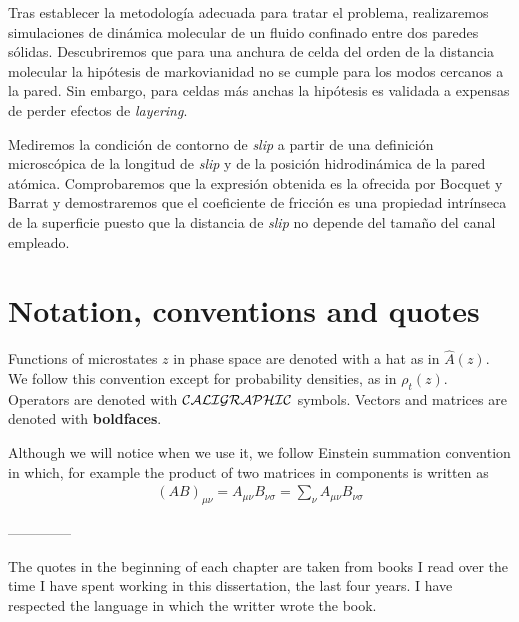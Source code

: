 \documentclass[b5paper,openright,10pt]{book}
\begin{document}
Tras establecer la metodología adecuada para tratar el problema, realizaremos simulaciones de dinámica molecular de un fluido confinado entre dos paredes sólidas. Descubriremos que para una anchura de celda del orden de la distancia molecular la hipótesis de markovianidad no se cumple para los modos cercanos a la pared. Sin embargo, para celdas más anchas la hipótesis es validada a expensas de perder efectos de \textit{layering}. 

Mediremos la condición de contorno de \textit{slip} a partir de una definición microscópica de la longitud de \textit{slip} y de la posición hidrodinámica de la pared atómica. Comprobaremos que la expresión obtenida es la ofrecida por Bocquet y Barrat \cite{Bocquet1994} y demostraremos que el coeficiente de fricción es una propiedad intrínseca de la superficie puesto que la distancia de \textit{slip} no depende del tamaño del canal empleado. 


\chapter*{Notation, conventions and quotes}

Functions of microstates $z$ in phase space are denoted with a hat as in $\hat{A}(z)$. We follow this convention except for probability densities, as in $\rho_t(z)$. Operators are denoted with ${\cal CALIGRAPHIC}$ symbols. Vectors and matrices are denoted with {\bf boldfaces}.

Although we will notice when we use it, we follow Einstein summation convention in which, for example the product of two matrices in components is written as
\begin{align}
    (AB)_{\mu\nu} = A_{\mu\nu}B_{\nu\sigma}=\sum_{\nu}A_{\mu\nu}B_{\nu\sigma} \nonumber
\end{align}

--------------

The quotes in the beginning of each chapter are taken from books I read over the time I have spent working in this dissertation, the last four years. I have respected the language in which the writter wrote the book. 

\setcounter{chapter}{-1}
\end{document}

